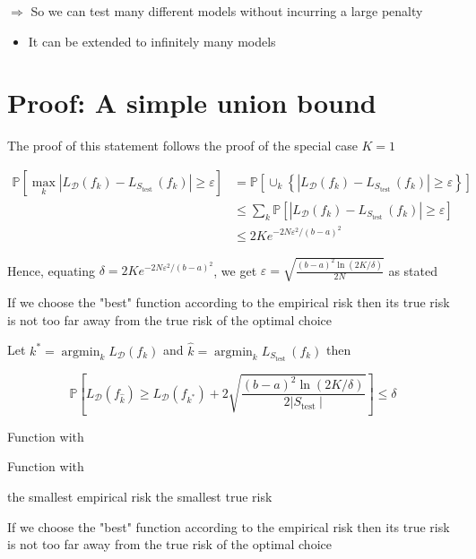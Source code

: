 $\Rightarrow$ So we can test many different models without incurring a large penalty

\begin{itemize}
  \item It can be extended to infinitely many models
\end{itemize}

\section*{Proof: A simple union bound}
The proof of this statement follows the proof of the special case $K=1$

$$
\begin{aligned}
\mathbb{P}\left[\max _{k}\left|L_{\mathscr{D}}\left(f_{k}\right)-L_{S_{\text {test }}}\left(f_{k}\right)\right| \geq \varepsilon\right] & =\mathbb{P}\left[\cup_{k}\left\{\left|L_{\mathscr{D}}\left(f_{k}\right)-L_{S_{\text {test }}}\left(f_{k}\right)\right| \geq \varepsilon\right\}\right] \\
& \leq \sum_{k} \mathbb{P}\left[\left|L_{\mathscr{D}}\left(f_{k}\right)-L_{S_{\text {test }}}\left(f_{k}\right)\right| \geq \varepsilon\right] \\
& \leq 2 K e^{-2 N \varepsilon^{2} /(b-a)^{2}}
\end{aligned}
$$

Hence, equating $\delta=2 K e^{-2 N \varepsilon^{2} /(b-a)^{2}}$, we get $\varepsilon=\sqrt{\frac{(b-a)^{2} \ln (2 K / \delta)}{2 N}}$ as stated

If we choose the "best" function according to the empirical risk then its true risk is not too far away from the true risk of the optimal choice


Let $k^{*}=\operatorname{argmin}_{k} L_{\mathscr{D}}\left(f_{k}\right)$ and $\hat{k}=\operatorname{argmin}_{k} L_{S_{\text {test }}}\left(f_{k}\right)$ then

$$
\mathbb{P}\left[L_{\mathscr{D}}\left(f_{\hat{k}}\right) \geq L_{\mathscr{D}}\left(f_{k^{*}}\right)+2 \sqrt{\frac{(b-a)^{2} \ln (2 K / \delta)}{2\left|S_{\text {test }}\right|}}\right] \leq \delta
$$

Function with

Function with

the smallest empirical risk the smallest true risk

If we choose the "best" function according to the empirical risk then its true risk is not too far away from the true risk of the optimal choice

